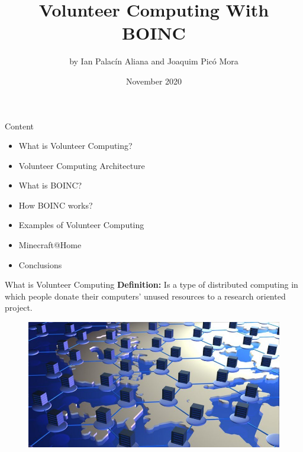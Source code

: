 \documentclass{beamer}
\title{Volunteer Computing With BOINC}
\author{by Ian Palacín Aliana and Joaquim Picó Mora}
\date{November 2020}
\begin{document}
\maketitle
\begin{frame}{Content}
\begin{itemize}
\item What is Volunteer Computing? 
\item Volunteer Computing Architecture
\item What is BOINC?
\item How BOINC works?
\item Examples of Volunteer Computing
\item Minecraft@Home
\item Conclusions
\end{itemize}
\end{frame}
%
\begin{frame}{What is Volunteer Computing}
\textbf{Definition:} Is a type of distributed computing in which people donate their computers' unused resources to a research oriented project.
\begin{figure}
  \includegraphics[width=\linewidth]{diapo1.jpg}
\end{figure}
\end{frame}
\end{document}
